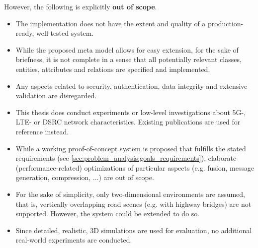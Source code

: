 However, the following is explicitly \textbf{out of scope}.
\begin{itemize}
	\item The implementation does not have the extent and quality of a production-ready, well-tested system.
	\item While the proposed meta model allows for easy extension, for the sake of briefness, it is not complete in a sense that all potentially relevant classes, entities, attributes and relations are specified and implemented.
	\item Any aspects related to security, authentication, data integrity and extensive validation are disregarded.
	\item This thesis does conduct experiments or low-level investigations about 5G-, LTE- or DSRC network characteristics. Existing publications are used for reference instead.
	\item While a working proof-of-concept system is proposed that fulfills the stated requirements (see \cref{sec:problem_analysis:goals_requirements}), elaborate (performance-related) optimizations of particular aspects (e.g. fusion, message generation, compression, ...) are out of scope.
	\item For the sake of simplicity, only two-dimensional environments are assumed, that is, vertically overlapping road scenes (e.g. with highway bridges) are not supported. However, the system could be extended to do so.
	\item Since detailed, realistic, 3D simulations are used for evaluation, no additional real-world experiments are conducted.
\end{itemize}